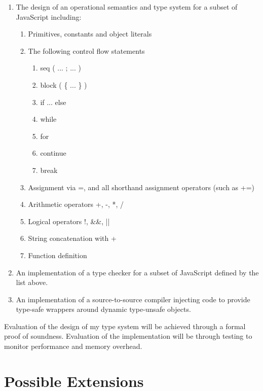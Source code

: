 \documentclass{article}
\begin{document}
		\begin{enumerate} 
			\item The design of an operational semantics and type system for a subset of JavaScript including: 
			\begin{enumerate}

				\item Primitives, constants and object literals  
				\item The following control flow statements   
				\begin{enumerate}    
					\item seq ( ... ; ... )   
					\item block ( \{ ... \} )    
					\item if ... else    
					\item while    
					\item for     
					\item continue    
					\item break    
				\end{enumerate}  
				\item Assignment via =, and all shorthand assignment operators (such  as +=)  
				\item Arithmetic operators +, -, *, /  
				\item Logical operators !, \&\&, ||  
				\item String concatenation with +  
				\item Function definition 
			\end{enumerate} 
			
			\item An implementation of a type checker for a subset of JavaScript defined by the list above. 

			\item An implementation of a source-to-source compiler injecting code to provide type-safe wrappers around dynamic type-unsafe objects.
		\end{enumerate}

		Evaluation of the design of my type system will be achieved through a formal proof of soundness. Evaluation of the implementation will be through testing to monitor performance and memory overhead.

	\section{Possible Extensions}\label{possible-extensions}
\end{document}
